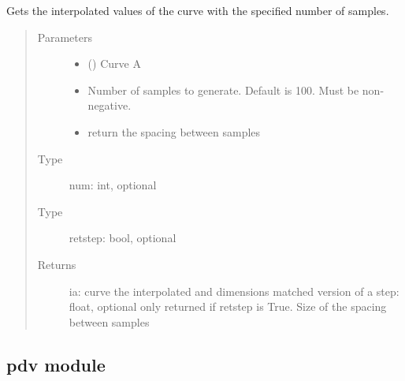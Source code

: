 \documentclass[letterpaper,10pt,english]{sphinxmanual}
\begin{document}

\begin{fulllineitems}
\label{\detokenize{pydv:curve.interp1d}}
Gets the interpolated values of the curve with the specified number of samples.
\begin{quote}\begin{description}
\item[{Parameters}] \leavevmode\begin{itemize}
\item {} 
 () \textendash{} Curve A

\item {} 
 \textendash{} Number of samples to generate. Default is 100. Must be non-negative.

\item {} 
 \textendash{} return the spacing between samples

\end{itemize}

\item[{Type}] \leavevmode
num: int, optional

\item[{Type}] \leavevmode
retstep: bool, optional

\item[{Returns}] \leavevmode
ia: curve \textendash{} the interpolated and dimensions matched version of a
step: float, optional \textendash{} only returned if retstep is True. Size of the spacing between samples

\end{description}\end{quote}

\end{fulllineitems}



\subsection{pdv module}
\label{\detokenize{pydv:module-pdv}}\label{\detokenize{pydv:pdv-module}}
\end{document}
